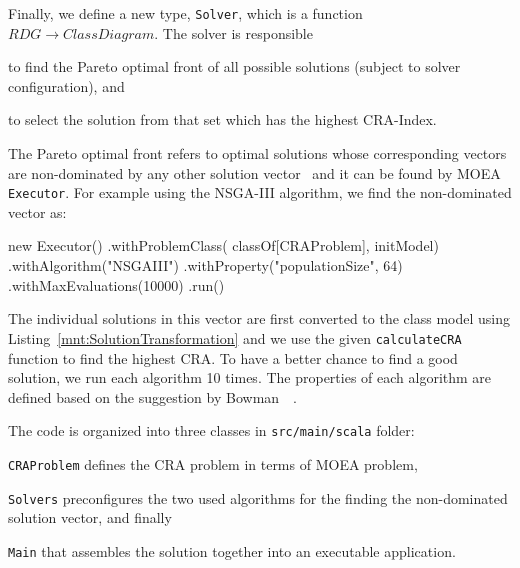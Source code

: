 Finally, we define a new type, \texttt{Solver}, which is a function $RDG \rightarrow ClassDiagram$.
The solver is responsible
%
\begin{inparaenum}[(1)]
  \item to find the Pareto optimal front of all possible solutions (subject to solver configuration), and
  \item to select the solution from that set which has the highest CRA-Index.
\end{inparaenum}
The Pareto optimal front refers to optimal solutions whose corresponding vectors are non-dominated by any other solution vector~\cite{bowman2010solving} and it can be found by MOEA \texttt{Executor}.
For example using the NSGA-III algorithm, we find the non-dominated vector as:
%
\begin{scalacode}
new Executor()
  .withProblemClass(
    classOf[CRAProblem], 
    initModel)
  .withAlgorithm("NSGAIII")
  .withProperty("populationSize", 64)
  .withMaxEvaluations(10000)
  .run()
\end{scalacode}
%
The individual solutions in this vector are first converted to the class model using Listing~\ref{mnt:SolutionTransformation} and we use the given \texttt{calculateCRA} function to find the highest CRA.
To have a better chance to find a good solution, we run each algorithm 10 times.
The properties of each algorithm are defined based on the suggestion by Bowman~\Etal~\cite{bowman2010solving}.

The code is organized into three classes in \texttt{src/main/scala} folder:
%
\begin{compactitem}[---]
  \item \texttt{CRAProblem} defines the CRA problem in terms of MOEA problem,
  \item \texttt{Solvers} preconfigures the two used algorithms for the finding the non-dominated solution vector, and finally
  \item \texttt{Main} that assembles the solution together into an executable application.
\end{compactitem}